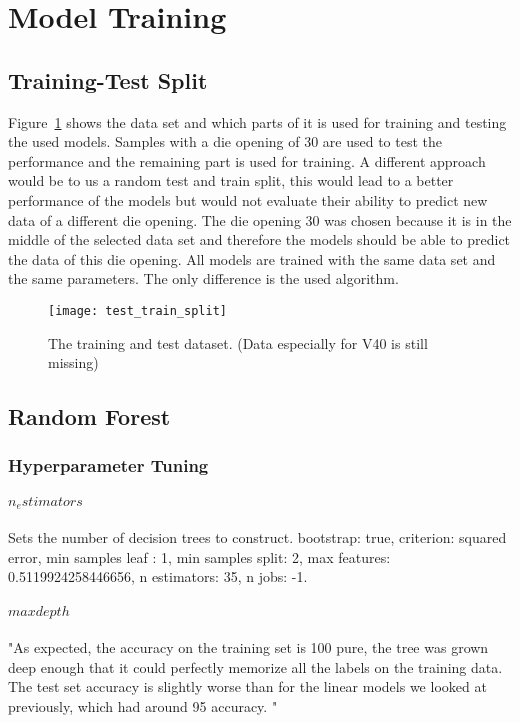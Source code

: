 \section{Model Training}


\subsection{Training-Test Split}
Figure~\ref{fig:train_test_split} shows the data set and which parts of it is used for training and testing the used models. Samples with a die opening of 30 are used to test the performance and the remaining part is used for training. 
A different approach would be to us a random test and train split, this would lead to a better performance of the models but would not evaluate their ability to predict new data of a different die opening.
The die opening 30 was chosen because it is in the middle of the selected data set and therefore the models should be able to predict the data of this die opening.
All models are trained with the same data set and the same parameters. The only difference is the used algorithm.


\begin{figure}[H]
    \centering
    \texttt{[image: test\_train\_split]}
    \caption{The training and test dataset. (Data especially for V40 is still missing)}
    \label{fig:train_test_split}
\end{figure}

\subsection{Random Forest}

\subsubsection*{Hyperparameter Tuning}

\paragraph*{$n_estimators$} 
Sets the number of decision trees to construct. 
bootstrap: true, criterion: squared error, min samples leaf : 1, min samples split: 2, max features: 0.5119924258446656, n estimators: 35, n jobs: -1.

\paragraph*{$max depth$} 
"As expected, the accuracy on the training set is 100%
pure, the tree was grown deep enough that it could perfectly
memorize all the labels on the training data. The test set accuracy is
slightly worse than for the linear models we looked at previously, which had around 95%
accuracy. " \cite[p. 133-136]{muller_introductionmachinelearning_2016}

